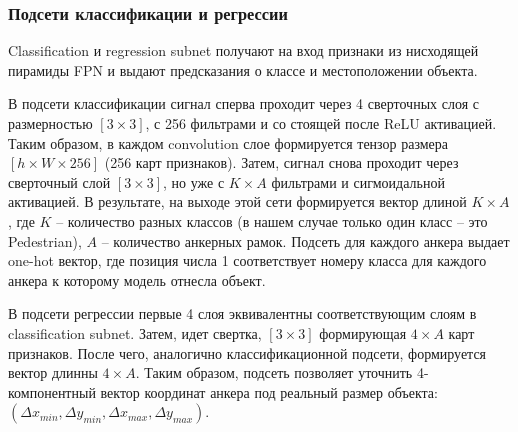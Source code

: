\subsubsection{Подсети классификации и регрессии}

Classification и regression subnet получают на вход признаки из нисходящей пирамиды FPN и выдают предсказания о классе и местоположении объекта. 

В подсети классификации сигнал сперва проходит через 4 сверточных слоя с размерностью $[3 \times 3]$, с 256 фильтрами и со стоящей после ReLU активацией. Таким образом, в каждом convolution слое формируется тензор размера $[h \times W \times 256]$ (256 карт признаков). Затем, сигнал снова проходит через сверточный слой $[3 \times 3]$, но уже с $K \times A$ фильтрами и сигмоидальной активацией. В результате, на выходе этой сети формируется вектор длиной $K \times A$, где $K$ -- количество разных классов (в нашем случае только один класс -- это Pedestrian), $A$ -- количество анкерных рамок. Подсеть для каждого анкера выдает one-hot вектор, где позиция числа 1 соответствует номеру класса для каждого анкера к которому модель отнесла объект.

В подсети регрессии первые 4 слоя эквивалентны соответствующим слоям в classification subnet. Затем, идет свертка,  $[3 \times 3]$ формирующая $4 \times A$ карт признаков. После чего, аналогично классификационной подсети, формируется вектор длинны $4 \times A$. Таким образом, подсеть позволяет уточнить 4-компонентный вектор координат анкера под реальный размер объекта: $(\Delta x_{min}, \Delta y_{min}, \Delta x_{max}, \Delta y_{max})$.